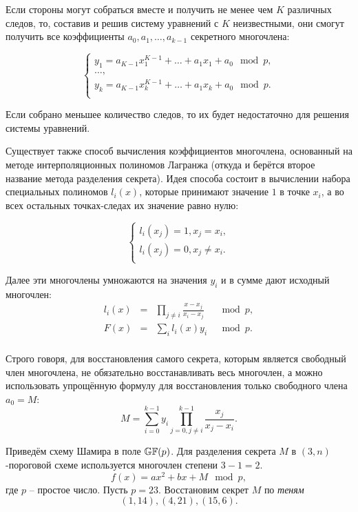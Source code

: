 Если стороны могут собраться вместе и получить не менее чем $K$ различных следов, то, составив и решив систему уравнений с $K$ неизвестными, они смогут получить все коэффициенты $a_0, a_1, \dots, a_{k-1}$ секретного многочлена:

\[ \left\{ \begin{array}{l}
    y_1 = a_{K-1}x_1^{K-1} + \dots + a_1 x_1 + a_0 \mod p, \\
    \dots, \\
    y_k = a_{K-1}x_k^{K-1} + \dots + a_1 x_k + a_0 \mod p. \\
\end{array} \right. \]

Если собрано меньшее количество следов, то их будет недостаточно для решения системы уравнений.

Существует также способ вычисления коэффициентов многочлена, основанный на методе интерполяционных полиномов Лагранжа (откуда и берётся второе название метода разделения секрета). Идея способа состоит в вычислении набора специальных полиномов $l_i \left( x \right)$, которые принимают значение $1$ в точке $x_i$, а во всех остальных точках-следах их значение равно нулю:

\[ \begin{cases}
	l_i \left( x_j \right) = 1, x_j = x_i, \\
	l_i \left( x_j \right) = 0, x_j \ne x_i. \\
\end{cases} \]

Далее эти многочлены умножаются на значения $y_i$ и в сумме дают исходный многочлен:
\[\begin{array}{llll}
  l_i \left( x \right) &=& \prod\limits_{j \ne i} {\frac{{x - x_j }}{{x_i  - x_j }}} &\mod p, \\
  F\left( x \right) &=& \sum\limits_i {l_i \left( x \right)y_i } &\mod p. \\
\end{array}\]

Строго говоря, для восстановления самого секрета, которым является свободный член многочлена, не обязательно восстанавливать весь многочлен, а можно использовать упрощённую формулу для восстановления только свободного члена $a_0 = M$:
    \[ M = \sum\limits_{i=0}^{k-1} y_i \prod\limits_{j=0, j \neq i}^{k-1} \frac{x_j}{x_j - x_i}. \]

\example
Приведём схему Шамира в поле $\mathbb{GF}(p)$. Для разделения секрета $M$ в $(3,n)$-пороговой схеме используется многочлен степени $3-1=2$.
    \[ f(x) = a x^2 + b x + M \mod p, \]
где $p$ -- простое число. Пусть $p=23$. Восстановим секрет $M$ по \emph{теням}
    \[ (1,14), (4,21), (15,6). \]

